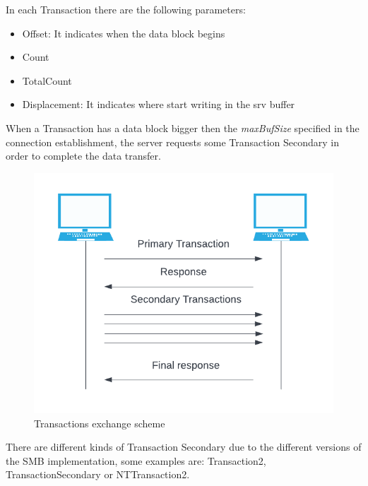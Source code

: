 In each Transaction there are the following parameters\cite{microsoft-transactions}:
\begin{itemize}
    \item Offset: It indicates when the data block begins
    \item Count
    \item TotalCount
    \item Displacement: It indicates where start writing in the srv buffer
\end{itemize}
\clearpage
\noindent When a Transaction has a data block bigger then the \textit{maxBufSize} specified in the connection establishment, the server requests some Transaction Secondary in order
to complete the data transfer\cite{microsoft-transactions}.\\
\begin{figure}[ht!]
    \centering
      \includegraphics[]{images/transactions_scheme.png}
      \caption{Transactions exchange scheme}
\end{figure}

\noindent There are different kinds of Transaction Secondary due to the different versions of the SMB implementation,
some examples are: Transaction2, TransactionSecondary or NTTransaction2.